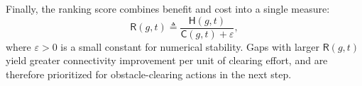 Finally, the ranking score combines benefit and cost into a single measure:
\begin{equation}\label{eq:gap-score}
  \mathsf{R}(g,t)\triangleq
  \frac{\mathsf{H}(g,t)}{\mathsf{C}(g,t)+\varepsilon},
\end{equation}
where $\varepsilon>0$ is a small constant for numerical stability. Gaps
with larger $\mathsf{R}(g,t)$ yield greater connectivity improvement per
unit of clearing effort, and are therefore prioritized for obstacle-clearing
actions in the next step.
